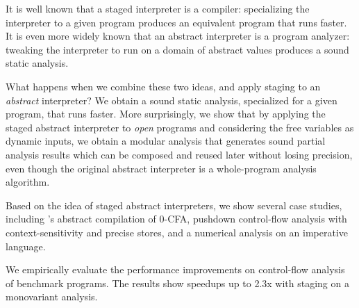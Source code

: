 It is well known that a staged interpreter is a compiler: specializing the interpreter to a given program
produces an equivalent program that runs faster.
It is even more widely known that an abstract interpreter is a program analyzer: tweaking the 
interpreter to run on a domain of abstract values produces a sound static analysis.

What happens when we combine these two ideas, and apply staging to an \emph{abstract} interpreter? 
We obtain a sound static analysis, specialized for a given program, that runs faster.
%
More surprisingly, we show that by applying the staged abstract interpreter to \textit{open} 
programs and considering the free variables as dynamic inputs, 
we obtain a modular analysis that generates sound partial analysis results which can be composed 
and reused later without losing precision, even though the original abstract interpreter is a whole-program 
analysis algorithm.

Based on the idea of staged abstract interpreters, we show several case studies, including 
\citeauthor{Boucher:1996:ACN:647473.727587}'s abstract compilation of 0-CFA, pushdown
control-flow analysis with context-sensitivity and precise stores, and a numerical
analysis on an imperative language.

We empirically evaluate the performance improvements on control-flow analysis of benchmark programs.
The results show speedups up to 2.3x with staging on a monovariant analysis.





